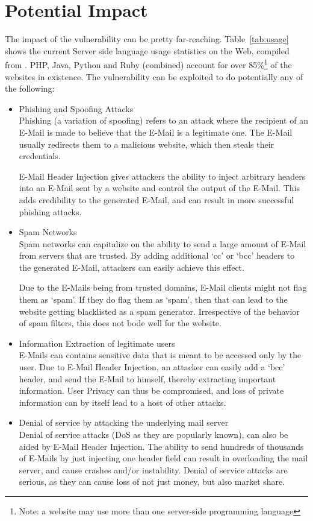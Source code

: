 \section{Potential Impact}

The impact of the vulnerability can be pretty far-reaching.
Table~\ref{tab:usage} shows the current Server side language usage statistics on the Web, compiled from \cite{W3techs}. 
PHP, Java, Python and Ruby (combined) account for over 85\%\footnote{Note: a website may use more than one server-side programming language} of the websites in existence. The vulnerability can be exploited to do potentially any of the following:


\begin{itemize}
	\item Phishing and Spoofing Attacks\\
    Phishing (a variation of spoofing) refers to an attack where the recipient of an E-Mail is made to believe that the E-Mail is a legitimate one. The E-Mail usually redirects them to a malicious website, which then steals their credentials. 
    
    E-Mail Header Injection gives attackers the ability to inject arbitrary headers into an E-Mail sent by a website and control the output of the E-Mail. This adds credibility to the generated E-Mail, and can result in more successful phishing attacks.
	
	\item Spam Networks\\
	Spam networks can capitalize on the ability to send a large amount of E-Mail from servers that are trusted. By adding additional `cc' or `bcc' headers to the generated E-Mail, attackers can easily achieve this effect. 
	
	Due to the E-Mails being from trusted domains, E-Mail clients might not flag them as `spam'. If they do flag them as `spam', then that can lead to the website getting blacklisted as a spam generator. Irrespective of the behavior of spam filters, this does not bode well for the website.
	
	\item Information Extraction of legitimate users\\
	E-Mails can contains sensitive data that is meant to be accessed only by the user. Due to E-Mail Header Injection, an attacker can easily add a `bcc' header, and send the E-Mail to himself, thereby extracting important information.
	User Privacy can thus be compromised, and loss of private information can by itself lead to a host of other attacks.
	
	\item Denial of service by attacking the underlying mail server\\
    Denial of service attacks (DoS as they are popularly known), can also be aided by E-Mail Header Injection. The ability to send hundreds of thousands of E-Mails by just injecting one header field can result in overloading the mail server, and cause crashes and/or instability. Denial of service attacks are serious, as they can cause loss of not just money, but also market share.
\end{itemize}

